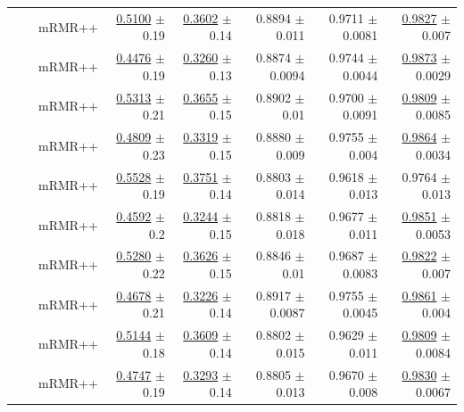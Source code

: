 \begin{longtable}{llp{}rrrrr}
 &  & mRMR++ & \underline{0.5100} {\scriptsize $\pm$ 0.19} & \underline{0.3602} {\scriptsize $\pm$ 0.14} & 0.8894 {\scriptsize $\pm$ 0.011} & 0.9711 {\scriptsize $\pm$ 0.0081} & \underline{0.9827} {\scriptsize $\pm$ 0.007} \\
 &  & mRMR++ & \underline{0.4476} {\scriptsize $\pm$ 0.19} & \underline{0.3260} {\scriptsize $\pm$ 0.13} & 0.8874 {\scriptsize $\pm$ 0.0094} & 0.9744 {\scriptsize $\pm$ 0.0044} & \underline{0.9873} {\scriptsize $\pm$ 0.0029} \\
 &  & mRMR++ & \underline{0.5313} {\scriptsize $\pm$ 0.21} & \underline{0.3655} {\scriptsize $\pm$ 0.15} & 0.8902 {\scriptsize $\pm$ 0.01} & 0.9700 {\scriptsize $\pm$ 0.0091} & \underline{0.9809} {\scriptsize $\pm$ 0.0085} \\
 &  & mRMR++ & \underline{0.4809} {\scriptsize $\pm$ 0.23} & \underline{0.3319} {\scriptsize $\pm$ 0.15} & 0.8880 {\scriptsize $\pm$ 0.009} & 0.9755 {\scriptsize $\pm$ 0.004} & \underline{0.9864} {\scriptsize $\pm$ 0.0034} \\
 &  & mRMR++ & \underline{0.5528} {\scriptsize $\pm$ 0.19} & \underline{0.3751} {\scriptsize $\pm$ 0.14} & 0.8803 {\scriptsize $\pm$ 0.014} & 0.9618 {\scriptsize $\pm$ 0.013} & 0.9764 {\scriptsize $\pm$ 0.013} \\
 &  & mRMR++ & \underline{0.4592} {\scriptsize $\pm$ 0.2} & \underline{0.3244} {\scriptsize $\pm$ 0.15} & 0.8818 {\scriptsize $\pm$ 0.018} & 0.9677 {\scriptsize $\pm$ 0.011} & \underline{0.9851} {\scriptsize $\pm$ 0.0053} \\
 &  & mRMR++ & \underline{0.5280} {\scriptsize $\pm$ 0.22} & \underline{0.3626} {\scriptsize $\pm$ 0.15} & 0.8846 {\scriptsize $\pm$ 0.01} & 0.9687 {\scriptsize $\pm$ 0.0083} & \underline{0.9822} {\scriptsize $\pm$ 0.007} \\
 &  & mRMR++ & \underline{0.4678} {\scriptsize $\pm$ 0.21} & \underline{0.3226} {\scriptsize $\pm$ 0.14} & 0.8917 {\scriptsize $\pm$ 0.0087} & 0.9755 {\scriptsize $\pm$ 0.0045} & \underline{0.9861} {\scriptsize $\pm$ 0.004} \\
 &  & mRMR++ & \underline{0.5144} {\scriptsize $\pm$ 0.18} & \underline{0.3609} {\scriptsize $\pm$ 0.14} & 0.8802 {\scriptsize $\pm$ 0.015} & 0.9629 {\scriptsize $\pm$ 0.011} & \underline{0.9809} {\scriptsize $\pm$ 0.0084} \\
 &  & mRMR++ & \underline{0.4747} {\scriptsize $\pm$ 0.19} & \underline{0.3293} {\scriptsize $\pm$ 0.14} & 0.8805 {\scriptsize $\pm$ 0.013} & 0.9670 {\scriptsize $\pm$ 0.008} & \underline{0.9830} {\scriptsize $\pm$ 0.0067} \\

\end{longtable}
